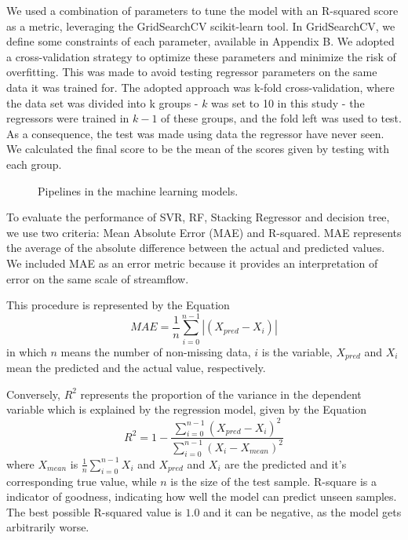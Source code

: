 \documentclass[12pt]{article}
\begin{document}
We used a combination of parameters to tune the model with an R-squared score as a metric, leveraging the GridSearchCV scikit-learn tool. In GridSearchCV, we define some constraints of each parameter, available in Appendix B. We adopted a cross-validation strategy to optimize these parameters and minimize the risk of overfitting. This was made to avoid testing regressor parameters on the same data it was trained for. The adopted approach was k-fold cross-validation, where the data set was divided into k groups - $k$ was set to 10 in this study - the regressors were trained in $k-1$ of these groups, and the fold left was used to test. As a consequence, the test was made using data the regressor have never seen. We calculated the final score to be the mean of the scores given by testing with each group.

\begin{figure}[htbp]
  \centering
  {\footnotesize}
  \caption{Pipelines in the machine learning models.}
  \label{fig:pipelines}
\end{figure}

To evaluate the performance of SVR, RF, Stacking Regressor and decision tree, we use two criteria: Mean Absolute Error (MAE) and R-squared. MAE represents the average of the absolute difference between the actual and predicted values. We included MAE as an error metric because it provides an interpretation of error on the same scale of streamflow.

This procedure is represented by the Equation
    \begin{equation}
        \label{eqn:mae}
        MAE={\frac{1}{n}\sum_{i=0}^{n-1}|(X_{pred}-X_{i})|}
    \end{equation}
in which $n$ means the number of non-missing data, $i$ is the variable, $X_{pred}$ and $X_{i}$ mean the predicted and the actual value, respectively.

Conversely, $R^2$ represents the proportion of the variance in the dependent variable which is explained by the regression model, given by the Equation
    \begin{equation}
        \label{eqn:r2}
        R^2={1 - \frac{\sum\limits_{i=0}^{n-1}(X_{pred}-X_{i})^{2}}
                      {\sum\limits_{i=0}^{n-1}(X_{i}-X_{mean})^{2}}}
    \end{equation}
where $X_{mean}$ is $\frac{1}{n}\sum_{i=0}^{n-1}X_{i}$ and $X_{pred}$ and $X_{i}$ are the predicted and it's corresponding true value, while $n$ is the size of the test sample. R-square is a indicator of goodness, indicating how well the model can predict unseen samples. The best possible R-squared value is $1.0$ and it can be negative, as the model gets arbitrarily worse.
\end{document}
